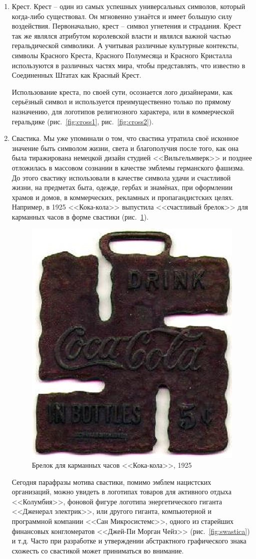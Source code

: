 \begin{enumerate}
\item Крест. Крест -- один из самых успешных универсальных символов, который
  когда-либо существовал. Он мгновенно узнаётся и  имеет большую силу
  воздействия. Первоначально, крест -- символ угнетения и страдания. Крест так
  же являлся атрибутом королевской власти и являлся важной частью
  геральдической символики. А учитывая различные культурные контексты,
  символы Красного Креста, Красного Полумесяца и Красного Кристалла
  используются в различных частях мира, чтобы представлять, что известно в
  Соединенных Штатах как Красный Крест.



  Использование креста, по своей сути,
  осознается лого дизайнерами, как серьёзный символ и используется
  преимущественно только по прямому назначению, для логотипов религиозного
  характера, или в коммерческой геральдике (рис.~\ref{fig:cross1}, рис.~\ref{fig:cross2}).


\item Свастика. Мы уже упоминали о том, что свастика утратила своё исконное
  значение быть символом жизни, света и благополучия после того, как она была
  тиражирована немецкой дизайн студией <<Вильгельмверк>> и позднее отложилась в
  массовом сознании в качестве эмблемы германского фашизма. До этого свастику
  использовали в качестве символа удачи и счастливой жизни, на предметах быта,
  одежде, гербах и знамёнах, при оформлении храмов и домов, в коммерческих,
  рекламных и пропагандистских целях. Например, в 1925 <<Кока-кола>> выпустила
  <<счастливый брелок>> для карманных часов в форме свастики (рис.~\ref{fig:cocaswastica}).

  \begin{figure}[h!]
  \centering
  \includegraphics[width=.2\linewidth]{images/cocaswastica}
  \caption{Брелок для карманных часов <<Кока-кола>>, 1925}
  \label{fig:cocaswastica}
\end{figure}

  Сегодня парафразы мотива свастики, помимо эмблем нацистских организаций,
  можно увидеть в логотипах товаров для активного отдыха <<Колумбия>>,
  фоновой фигуре логотипа энергетического гиганта <<Дженерал электрик>>,
  или другого гиганта, компьютерной и программной компании <<Сан Микросистемс>>,
  одного из старейших финансовых конгломератов <<Джей-Пи Морган Чейз>> (рис.~\ref{fig:swastica})
  и т.д. Часто при разработке и утверждении абстрактного графического знака
  схожесть со свастикой может приниматься во внимание.


\end{enumerate}
